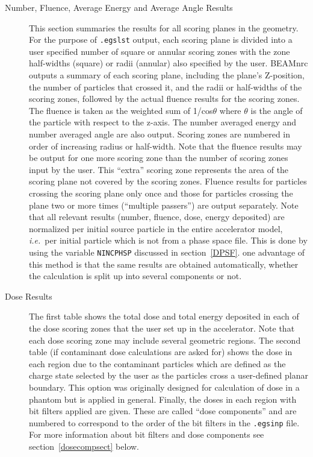 \documentclass[12pt,twoside]{article}
\newcommand{\ie}{{\em i.e.}}
\begin{document}
\begin{description}
\begin{description}
\item [Number, Fluence, Average Energy and Average Angle Results]
This section summaries the results for all scoring planes in
the geometry.  For the purpose of {\tt .egslst} output, each
scoring plane is divided into a user specified number of
square or annular scoring zones with the zone half-widths
(square) or radii (annular) also specified by the user.
BEAMnrc outputs a summary of each scoring plane, including
the plane's Z-position, the number of particles that crossed it, and the
radii or half-widths of the scoring zones, followed by the actual fluence
results for the scoring zones.  The fluence is taken as the weighted
sum of 1/cos$\theta$
where $\theta$ is the angle of the particle with respect to the z-axis.
The number averaged energy and number averaged angle are also output.
Scoring zones are numbered in order of
increasing radius or half-width.  Note that the fluence results may be
output for one more scoring zone than the number of scoring zones input
by the user.  This ``extra'' scoring zone represents the area of the
scoring plane not covered by the scoring zones.  Fluence results for
particles crossing the scoring plane only once and those for particles
crossing the plane two or more times (``multiple passers'') are output
separately.  Note that all relevant results (number, fluence, dose,
energy deposited) are normalized per initial
source particle in the entire accelerator model, \ie\ per initial
particle which is not from a phase space file.  This is done by using
the variable \verb+NINCPHSP+ discussed in section~\ref{DPSF}.  one
advantage of this method is that the same results are obtained
automatically,  whether the calculation is split up into several components
or not.

\item [Dose Results]
The first table shows the total dose and total energy deposited in each
of the dose scoring zones that the user set up in the accelerator.
Note that each dose scoring zone may include several geometric regions.
The second table (if contaminant dose calculations are asked for)
shows the dose in each region
due to the contaminant particles which are defined as the
charge state selected by the user as the particles cross a user-defined
planar boundary.  This option was originally designed for calculation of dose in a phantom
but is applied in general.
Finally, the doses in each region with bit filters applied are given.
These are called ``dose components'' and are numbered to correspond to the order
of the bit filters in the {\tt .egsinp} file.  For more information about bit filters
and dose components see section~\ref{dosecompsect} below.


\end{description}
\end{description}
\end{document}
